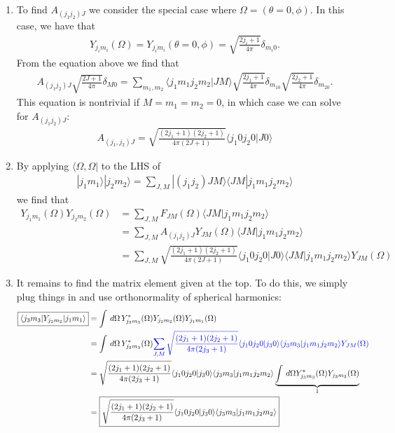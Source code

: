\documentclass{article}
\theoremstyle{definition}
\newcommand{\f}[2]{\frac{#1}{#2}}
\begin{document}
\begin{enumerate}[label=(\alph*)]
	\item To find $A_{(j_1j_2)J}$ we consider the special case where $\Omega = (\theta=0,\phi)$. In this case, we have that
	\begin{align*}
	Y_{j_im_i}(\Omega) = Y_{j_im_i}(\theta=0,\phi) = \sqrt{\f{2j_i+1}{4\pi}} \delta_{m_i0}.
	\end{align*}
	From the equation above we find that
	\begin{align*}
	A_{(j_1j_2)J} \sqrt{\f{2J+1}{4\pi}} \delta_{M0} = \sum_{m_1,m_2}  \langle j_1m_1j_2m_2 | JM\rangle \sqrt{\f{2j_1+1}{4\pi}} \delta_{m_10} \sqrt{\f{2j_2+1}{4\pi}} \delta_{m_20}.
	\end{align*}
	This equation is nontrivial if $M=m_1=m_2 = 0$, in which case we can solve for $A_{(j_1j_2)J}$:
	\begin{align*}
	\boxed{A_{(j_1,j_2)J} =   \sqrt{\f{(2j_1+1)(2j_2+1)}{4\pi(2J+1)}} \langle j_1 0 j_2 0 | J 0  \rangle }
	\end{align*}
	
	
	\item By applying $\langle \Omega,\Omega|$ to the LHS of 
	\begin{align*}
	|j_1m_1\rangle | j_2m_2\rangle = \sum_{J,M} |(j_1j_2)JM\rangle \langle JM| j_1m_1j_2m_2\rangle
	\end{align*}
	we find that
	\begin{align*}
	\boxed{Y_{j_1m_1} (\Omega) Y_{j_2m_2} (\Omega) }
	&= \sum_{J,M} F_{JM}(\Omega) \langle JM| j_1m_1j_2m_2\rangle \\
	&= \sum_{J,M} A_{(j_1j_2)J} Y_{JM}(\Omega) \langle JM| j_1m_1j_2m_2\rangle\\
	&= \boxed{\sum_{J,M} \sqrt{\f{(2j_1+1)(2j_2+1)}{4\pi(2J+1)}} \langle j_1 0 j_2 0 | J 0  \rangle  \langle JM| j_1m_1j_2m_2\rangle Y_{JM}(\Omega)}
	\end{align*}
	
	\item It remains to find the matrix element given at the top. To do this, we simply plug things in and use orthonormality of spherical harmonics:
	\begin{align*}
	\boxed{\langle j_3 m_3| Y_{j_2m_2} |j_1m_1\rangle }
	&= \int \,d\Omega \, Y^*_{j_3m_3}(\Omega) Y_{j_2m_2}(\Omega) Y_{j_1m_1}(\Omega) \\
	&= \int \,d\Omega \, Y^*_{j_3m_3}(\Omega) \textcolor{blue}{\sum_{J,M} \sqrt{\f{(2j_1+1)(2j_2+1)}{4\pi(2j_3+1)}} \langle j_1 0 j_2 0 | j_3 0  \rangle  \langle j_3 m_3| j_1 m_1 j_2m_2\rangle Y_{JM}(\Omega)}\\
	&= \sqrt{\f{(2j_1+1)(2j_2+1)}{4\pi(2j_3+1)}} \langle j_1 0 j_2 0 | j_3 0  \rangle  \langle j_3 m_3| j_1 m_1 j_2m_2\rangle \underbrace{\int \, d\Omega Y^*_{j_3m_3}(\Omega) Y_{j_3m_3}(\Omega) }_{1}\\
	&= \boxed{ \sqrt{\f{(2j_1+1)(2j_2+1)}{4\pi(2j_3+1)}} \langle j_1 0 j_2 0 | j_3 0  \rangle  \langle j_3 m_3| j_1 m_1 j_2m_2\rangle}
	\end{align*}
	
	
\end{enumerate}
\end{document}
